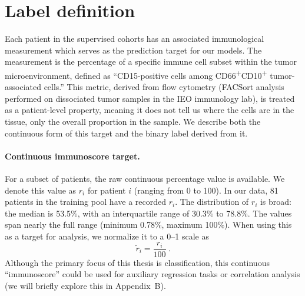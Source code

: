 \section{Label definition }
\label{sec:label_def}
Each patient in the supervised cohorts has an associated immunological measurement which serves as the prediction target for our models. The measurement is the percentage of a specific immune cell subset within the tumor microenvironment, defined as “CD15-positive cells among CD66\textsuperscript{+}CD10\textsuperscript{+} tumor-associated cells.” This metric, derived from flow cytometry (FACSort analysis performed on dissociated tumor samples in the IEO immunology lab), is treated as a patient-level property, meaning it does not tell us where the cells are in the tissue, only the overall proportion in the sample. We describe both the continuous form of this target and the binary label derived from it.

\paragraph{Continuous immunoscore target.}
For a subset of patients, the raw continuous percentage value is available. We denote this value as $r_i$ for patient $i$ (ranging from 0 to 100). In our data, 81 patients in the training pool have a recorded $r_i$. The distribution of $r_i$ is broad: the median is 53.5\%, with an interquartile range of 30.3\% to 78.8\%. The values span nearly the full range (minimum 0.78\%, maximum 100\%). When using this as a target for analysis, we normalize it to a 0--1 scale as
\begin{equation}\label{eq:immunoscore_norm}
\tilde{r}_i = \frac{r_i}{100}~.
\end{equation}
Although the primary focus of this thesis is classification, this continuous “immunoscore” could be used for auxiliary regression tasks or correlation analysis (we will briefly explore this in Appendix~B).

